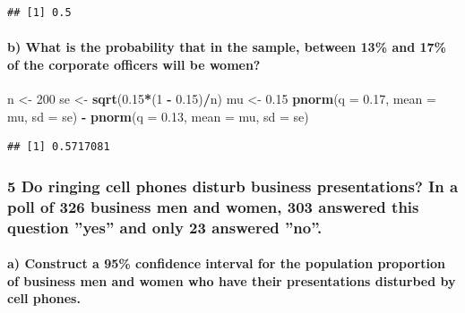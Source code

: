 \documentclass[]{article}
\newenvironment{Shaded}{\begin{snugshade}}{\end{snugshade}}
\newcommand{\KeywordTok}[1]{\textcolor[rgb]{0.13,0.29,0.53}{\textbf{#1}}}
\newcommand{\DataTypeTok}[1]{\textcolor[rgb]{0.13,0.29,0.53}{#1}}
\newcommand{\DecValTok}[1]{\textcolor[rgb]{0.00,0.00,0.81}{#1}}
\newcommand{\FloatTok}[1]{\textcolor[rgb]{0.00,0.00,0.81}{#1}}
\newcommand{\StringTok}[1]{\textcolor[rgb]{0.31,0.60,0.02}{#1}}
\newcommand{\OperatorTok}[1]{\textcolor[rgb]{0.81,0.36,0.00}{\textbf{#1}}}
\newcommand{\NormalTok}[1]{#1}
\let\oldparagraph\paragraph
\renewcommand{\paragraph}[1]{\oldparagraph{#1}\mbox{}}
\begin{document}
\begin{verbatim}
## [1] 0.5
\end{verbatim}

\paragraph{b) What is the probability that in the sample, between 13\%
and 17\% of the corporate officers will be
women?}\label{b-what-is-the-probability-that-in-the-sample-between-13-and-17-of-the-corporate-officers-will-be-women}

\begin{Shaded}
\begin{Highlighting}[]
\NormalTok{n <-}\StringTok{ }\DecValTok{200}
\NormalTok{se <-}\StringTok{ }\KeywordTok{sqrt}\NormalTok{(}\FloatTok{0.15}\OperatorTok{*}\NormalTok{(}\DecValTok{1} \OperatorTok{-}\StringTok{ }\FloatTok{0.15}\NormalTok{)}\OperatorTok{/}\NormalTok{n)}
\NormalTok{mu <-}\StringTok{ }\FloatTok{0.15}
\KeywordTok{pnorm}\NormalTok{(}\DataTypeTok{q =} \FloatTok{0.17}\NormalTok{, }\DataTypeTok{mean =}\NormalTok{ mu, }\DataTypeTok{sd =}\NormalTok{ se) }\OperatorTok{-}\StringTok{ }\KeywordTok{pnorm}\NormalTok{(}\DataTypeTok{q =} \FloatTok{0.13}\NormalTok{, }\DataTypeTok{mean =}\NormalTok{ mu, }\DataTypeTok{sd =}\NormalTok{ se)}
\end{Highlighting}
\end{Shaded}

\begin{verbatim}
## [1] 0.5717081
\end{verbatim}

\subsubsection{5 Do ringing cell phones disturb business presentations?
In a poll of 326 business men and women, 303 answered this question
''yes'' and only 23 answered
''no''.}\label{do-ringing-cell-phones-disturb-business-presentations-in-a-poll-of-326-business-men-and-women-303-answered-this-question-yes-and-only-23-answered-no.}

\paragraph{a) Construct a 95\% confidence interval for the population
proportion of business men and women who have their presentations
disturbed by cell
phones.}\label{a-construct-a-95-confidence-interval-for-the-population-proportion-of-business-men-and-women-who-have-their-presentations-disturbed-by-cell-phones.}
\end{document}
